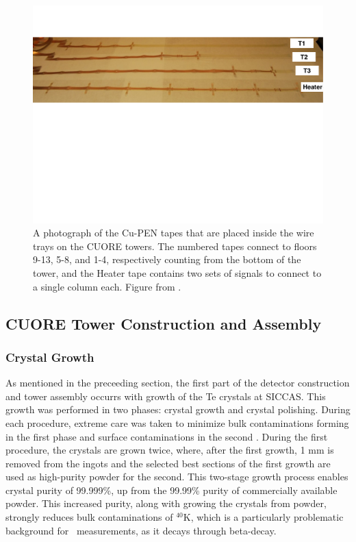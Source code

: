 \begin{figure}
    \centering
    \includegraphics[width=0.9\linewidth]{Figures/fig07.pdf}
    \caption[A photograph of the Cu-PEN tapes that are placed inside the wire trays on the CUORE towers.]
    {A photograph of the Cu-PEN tapes that are placed inside the wire trays on the CUORE towers.
    The numbered tapes connect to floors 9-13, 5-8, and 1-4, respectively counting from the bottom of the tower, and the Heater tape contains two sets of signals to connect to a single column each.
    Figure from \cite{Alduino:2016vtd}.}
    \label{fig:CuPEN}
\end{figure}

\subsection{CUORE Tower Construction and Assembly}

\subsubsection{Crystal Growth}
As mentioned in the preceeding section, the first part of the detector construction and tower assembly occurrs with growth of the Te crystals at SICCAS.
This growth was performed in two phases: crystal growth and crystal polishing.
During each procedure, extreme care was taken to minimize bulk contaminations forming in the first phase and surface contaminations in the second \cite{crystal_growth_methods, crystal_growth_methods_2, Barghouty:2010kj}.
During the first procedure, the crystals are grown twice, where, after the first growth, 1 mm is removed from the ingots and the selected best sections of the first growth are used as high-purity powder for the second.
This two-stage growth process enables crystal purity of 99.999\%, up from the 99.99\% purity of commercially available powder.
This increased purity, along with growing the crystals from powder, strongly reduces bulk contaminations of $^{40}$K, which is a particularly problematic background for \twonubb~measurements, as it decays through beta-decay.

